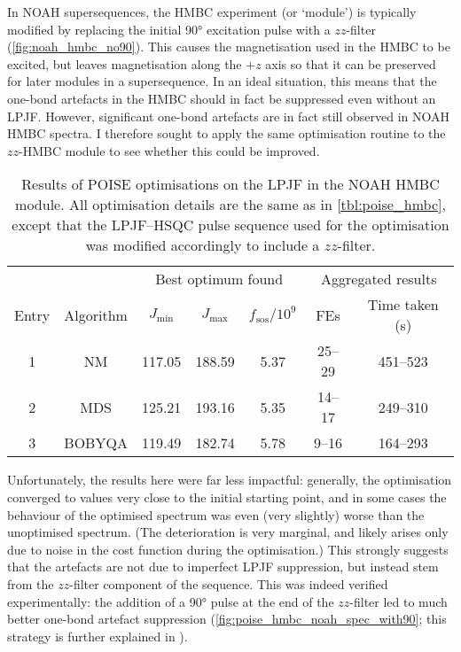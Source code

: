 In NOAH supersequences, the HMBC experiment (or `module') is typically modified by replacing the initial \ang{90} excitation pulse with a $zz$-filter (\cref{fig:noah_hmbc_no90}).
This causes the  magnetisation used in the HMBC to be excited, but leaves  magnetisation along the $+z$ axis so that it can be preserved for later modules in a supersequence.
In an ideal situation, this means that the one-bond artefacts in the HMBC should in fact be suppressed even without an LPJF.
However, significant one-bond artefacts are in fact still observed in NOAH HMBC spectra.
I therefore sought to apply the same optimisation routine to the $zz$-HMBC module to see whether this could be improved.


\begin{table}[htb]
    \centering
    \begin{tabular}{ccccccc}
        \toprule
              &           & \multicolumn{3}{c}{Best optimum found} & \multicolumn{2}{c}{Aggregated results} \\
        \cmidrule(lr){3-5} \cmidrule(lr){6-7}
        Entry & Algorithm & $J_\text{min}$ & $J_\text{max}$ & $f_\text{sos} / 10^9$ & FEs & Time taken (\si{\s}) \\
        \midrule
        1     & NM        & 117.05 & 188.59                 & 5.37 & 25--29 & 451--523 \\
        2     & MDS       & 125.21 & 193.16                 & 5.35 & 14--17 & 249--310 \\
        3     & BOBYQA    & 119.49 & 182.74                 & 5.78 & 9--16  & 164--293 \\
        \bottomrule
    \end{tabular}
    \caption[POISE optimisations on NOAH HMBC module]{
        Results of POISE optimisations on the LPJF in the NOAH HMBC module.
        All optimisation details are the same as in \cref{tbl:poise_hmbc}, except that the LPJF--HSQC pulse sequence used for the optimisation was modified accordingly to include a $zz$-filter.
    }
    \label{tbl:poise_hmbc_noah}
\end{table}

Unfortunately, the results here were far less impactful: generally, the optimisation converged to values very close to the initial starting point, and in some cases the behaviour of the optimised spectrum was even (very slightly) worse than the unoptimised spectrum.
(The deterioration is very marginal, and likely arises only due to noise in the cost function during the optimisation.)
This strongly suggests that the artefacts are not due to imperfect LPJF suppression, but instead stem from the $zz$-filter component of the sequence.
This was indeed verified experimentally: the addition of a \carbon{} \ang{90} pulse at the end of the $zz$-filter led to much better one-bond artefact suppression (\cref{fig:poise_hmbc_noah_spec_with90}; this strategy is further explained in ).

